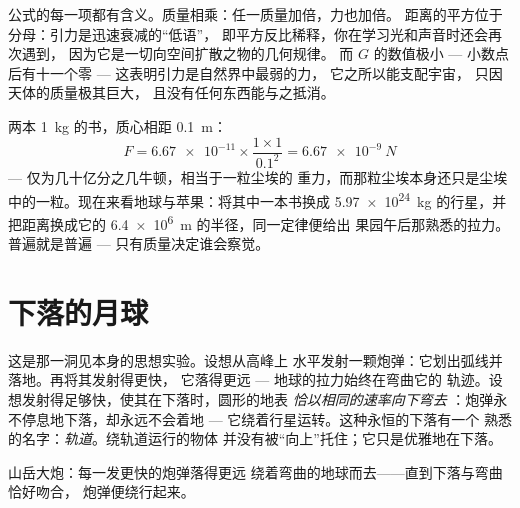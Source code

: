 \begin{example}[读懂定律]\label{ex:g9:gravitation:reading}
公式的每一项都有含义。质量相乘：任一质量加倍，力也加倍。
距离的平方位于分母：引力是迅速衰减的“低语”，
即平方反比稀释，你在学习光和声音时还会再次遇到，
因为它是一切向空间扩散之物的几何规律。
而 $G$ 的数值极小 --- 小数点后有十一个零 ---
这表明引力是自然界中最弱的力，
它之所以能支配宇宙，
只因天体的质量极其巨大，
且没有任何东西能与之抵消。
\end{example}

\begin{example}[为什么书架上的两本书不会撞在一起]\label{ex:g9:gravitation:books}
两本 \qty{1}{kg} 的书，质心相距 \qty{0.1}{m}：
\[
F = \num{6.67e-11} \times \frac{1 \times 1}{0.1^2}
= \qty{6.67e-9}{N}
\]
--- 仅为几十亿分之几牛顿，相当于一粒尘埃的
重力，而那粒尘埃本身还只是尘埃中的一粒。现在来看地球与苹果：将其中一本书换成
\qty{5.97e24}{kg} 的行星，并把距离换成它的
\qty{6.4e6}{m} 的半径，同一定律便给出
果园午后那熟悉的拉力。普遍就是普遍 ---
只有质量决定谁会察觉。
\end{example}

\section{下落的月球}

\begin{example}[山顶上的大炮]\label{ex:g9:gravitation:cannon}
这是那一洞见本身的思想实验。设想从高峰上
水平发射一颗炮弹：它划出弧线并落地。再将其发射得更快，
它落得更远 --- 地球的拉力始终在弯曲它的
轨迹。设想发射得足够快，使其在下落时，圆形的地表
\emph{恰以相同的速率向下弯去
}：炮弹永不停息地下落，却永远不会着地 ---
它绕着行星运转。这种永恒的下落有一个
熟悉的名字：\emph{轨道}。绕轨道运行的物体
并没有被“向上”托住；它只是优雅地在下落。
\end{example}

\begin{omfigure}

{\small 山岳大炮：每一发更快的炮弹落得更远
绕着弯曲的地球而去——直到下落与弯曲恰好吻合，
炮弹便绕行起来。}
\end{omfigure}

